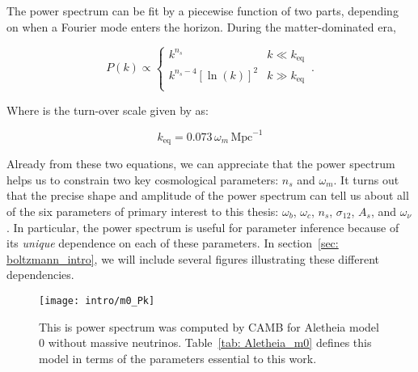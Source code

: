The power spectrum can be fit by a piecewise function of 
two parts, depending on when a Fourier mode enters the horizon.
During the matter-dominated era, 

\begin{equation}
\label{eq: n_s}
P(k) \propto 
\begin{cases}
      k^{n_s} & k \ll k_\text{eq} \\
      k^{n_s - 4} [\ln (k)]^2 & k \gg k_\text{eq} \\ 
    \end{cases}\,.
\end{equation}

Where is the turn-over scale given by \citet{FECS} as:

\begin{equation}
\label{eq: turnover}
k_\text{eq} = 0.073 \, \omega_m \, \mathrm{Mpc}^{-1}
\end{equation}


Already from these two equations, we can
appreciate that the power spectrum helps us to constrain two key cosmological
parameters: $n_s$ and $\omega_m$. It turns out that the precise shape and
amplitude of the power spectrum can tell us about all of the six
parameters of primary interest to this thesis:
$\omega_b$, $\omega_c$, $n_s$, $\sigma_{12}$, $A_s$, and $\omega_\nu$. 
In particular, the power spectrum is useful for parameter inference because of
its \textit{unique} dependence on each of these parameters. In 
section~\ref{sec: boltzmann_intro}, we will include several figures 
illustrating these different dependencies.


\begin{figure}[htb]
  \centering
  \texttt{[image: intro/m0\_Pk]}
  \caption[Aletheia Model 0 Power Spectrum]{This is power spectrum was
  computed by CAMB for Aletheia model 0 without massive neutrinos.
  Table~\ref{tab: Aletheia_m0} defines this model in terms
  of the parameters essential to this work.}
  \label{fig: first_power_spectrum}
\end{figure}

